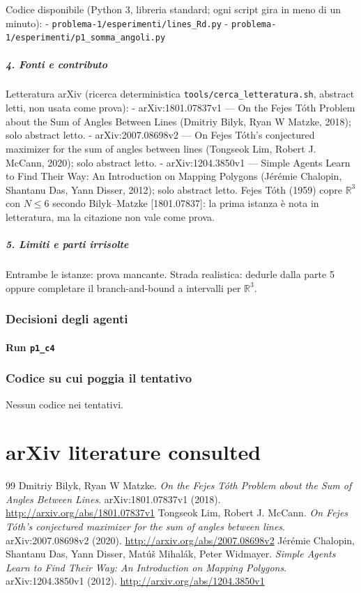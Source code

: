 \documentclass[11pt,a4paper]{article}
\begin{document}
Codice disponibile (Python 3, libreria standard; ogni script gira in
meno di un minuto): - \texttt{problema-1/esperimenti/lines\_Rd.py} -
\texttt{problema-1/esperimenti/p1\_somma\_angoli.py}

\subparagraph{4. Fonti e contributo}\label{fonti-e-contributo}

Letteratura arXiv (ricerca deterministica
\texttt{tools/cerca\_letteratura.sh}, abstract letti, non usata come
prova): - arXiv:1801.07837v1 --- On the Fejes Tóth Problem about the Sum
of Angles Between Lines (Dmitriy Bilyk, Ryan W Matzke, 2018); solo
abstract letto. - arXiv:2007.08698v2 --- On Fejes Tóth's conjectured
maximizer for the sum of angles between lines (Tongseok Lim, Robert J.
McCann, 2020); solo abstract letto. - arXiv:1204.3850v1 --- Simple
Agents Learn to Find Their Way: An Introduction on Mapping Polygons
(Jérémie Chalopin, Shantanu Das, Yann Disser, 2012); solo abstract
letto. Fejes Tóth (1959) copre \(\mathbb R^3\) con \(N\le6\) secondo
Bilyk--Matzke {[}1801.07837{]}: la prima istanza è nota in letteratura,
ma la citazione non vale come prova.

\subparagraph{5. Limiti e parti
irrisolte}\label{limiti-e-parti-irrisolte}

Entrambe le istanze: prova mancante. Strada realistica: dedurle dalla
parte 5 oppure completare il branch-and-bound a intervalli per
\(\mathbb R^3\).

\subsubsection{Decisioni degli agenti}
\paragraph{Run \texttt{p1\_c4}}

\subsubsection{Codice su cui poggia il tentativo}
Nessun codice nei tentativi.

\section{arXiv literature consulted}
\begin{thebibliography}{99}
 Dmitriy Bilyk, Ryan W Matzke. \emph{On the Fejes Tóth Problem about the Sum of Angles Between Lines}. arXiv:1801.07837v1 (2018). \url{http://arxiv.org/abs/1801.07837v1}
 Tongseok Lim, Robert J. McCann. \emph{On Fejes Tóth's conjectured maximizer for the sum of angles between lines}. arXiv:2007.08698v2 (2020). \url{http://arxiv.org/abs/2007.08698v2}
 Jérémie Chalopin, Shantanu Das, Yann Disser, Matúš Mihalák, Peter Widmayer. \emph{Simple Agents Learn to Find Their Way: An Introduction on Mapping Polygons}. arXiv:1204.3850v1 (2012). \url{http://arxiv.org/abs/1204.3850v1}
\end{thebibliography}
\end{document}
